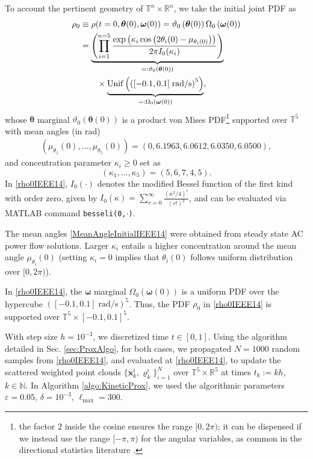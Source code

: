 \documentclass[10pt,twocolumn]{IEEEtran}
\newcommand{\blue}{\color{blue}}
\begin{document}
To account the pertinent geometry of $\mathbb{T}^{n}\times\mathbb{R}^{n}$, we take the initial joint PDF as
\begin{align}
\rho_{0}&\equiv\rho(t=0,\bm{\theta}(0),\bm{\omega}(0)) = \vartheta_{0}\left(\bm{\theta}(0)\right)\Omega_{0}\left(\bm{\omega}(0)\right)\nonumber\\
&=\underbrace{\left(\prod_{i=1}^{n=5}\dfrac{\exp\left(\kappa_{i}\cos\left(2\theta_{i}(0)-\mu_{\theta_{i}(0)}\right)\right)}{2\pi I_{0}(\kappa_{i})}\right)}_{=:\vartheta_{0}\left(\bm{\theta}(0)\right)}\nonumber\\
	&\qquad\times \underbrace{{\rm{Unif}}\left(\left([-0.1,0.1]\;\text{rad/s}\right)^{5}\right)}_{=:\Omega_{0}\left(\bm{\omega}(0)\right)},
\label{rho0IEEE14}		
\end{align}
whose $\bm{\theta}$ marginal $ \vartheta_{0}\left(\bm{\theta}(0)\right)$ is a product von Mises PDF\footnote{the factor $2$ inside the cosine ensures the range $[0,2\pi)$; it can be dispensed if we instead use the range $[-\pi,\pi)$ for the angular variables, as common in the directional statistics literature \cite{mardia2009directional}.} \cite{mardia2008multivariate,mardia2014some} supported over $\mathbb{T}^{5}$ with mean angles (in rad)
\begin{align}
\left(\mu_{\theta_{1}}(0),\hdots,\mu_{\theta_{5}}(0)\right)=\left(0, 6.1963, 6.0612, 6.0350, 6.0500\right),
\label{MeanAngleInitialIEEE14}	
\end{align}
and concentration parameter $\kappa_{i}\geq 0$ set as 
\[(\kappa_{1},\hdots,\kappa_5) = \left(5,6,7,4,5\right).\]
In \eqref{rho0IEEE14}, $I_{0}(\cdot)$ denotes the modified Bessel function of the first kind with order zero, given by $I_{0}(\kappa) = \sum_{r=0}^{\infty} \frac{\left(\kappa^{2}/4\right)^{r}}{(r!)^{2}}$, and can be evaluated via MATLAB command \texttt{besseli(0,$\cdot$)}. 

The mean angles \eqref{MeanAngleInitialIEEE14} were obtained from steady state AC power flow solutions. Larger $\kappa_{i}$ entails a higher concentration around the mean angle $\mu_{\theta_{i}}(0)$ (setting $\kappa_i=0$ implies that $\theta_{i}(0)$ follows uniform distribution over $[0,2\pi)$).

In \eqref{rho0IEEE14}, the $\bm{\omega}$ marginal $ \Omega_{0}\left(\bm{\omega}(0)\right)$ is a uniform PDF over the hypercube $\left([-0.1,0.1]\;\text{rad/s}\right)^{5}$. Thus, the PDF $\rho_0$ in \eqref{rho0IEEE14} is supported over $\mathbb{T}^{5}\times [-0.1,0.1]^{5}$.

With step size $h=10^{-3}$, we discretized time $t\in[0,1]$. Using the algorithm detailed in Sec. \ref{sec:ProxAlgo}, for both cases, we propagated $N=1000$ random {\blue{state}} samples from \eqref{rho0IEEE14}, and {\blue{corresponding joint PDF values}} evaluated at \eqref{rho0IEEE14}, to update the scattered weighted point clouds $\{\bm{x}_{k}^{i},\varrho_{k}^{i}\}_{i=1}^{N}$ over $\mathbb{T}^{5}\times\mathbb{R}^{5}$ at times $t_{k}:=kh$, $k\in\mathbb{N}$. In Algorithm \ref{algo:KineticProx}, we used the algorithmic parameters $\varepsilon=0.05$, $\delta=10^{-3}$, $\ell_{\max}=300$.
\end{document}
